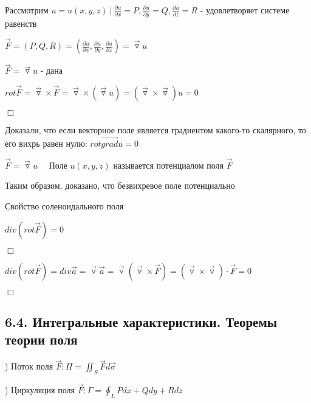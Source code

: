 \documentclass[12pt]{article}
\begin{document}
    Рассмотрим $u = u(x, y, z) \ | \ \frac{\partial u}{\partial x} = P, \frac{\partial u}{\partial y} = Q, \frac{\partial u}{\partial z} = R$ - удовлетворяет системе равенств

    $\overrightarrow{F} = (P, Q, R) = \left(\frac{\partial u}{\partial x}, \frac{\partial u}{\partial y}, \frac{\partial u}{\partial z}\right) = \overrightarrow{\triangledown} u$

    \fbox{\Longleftarrow} $\overrightarrow{F} = \overrightarrow{\triangledown}u$ - дана

    $rot \overrightarrow{F} = \overrightarrow{\triangledown} \times \overrightarrow{F} = \overrightarrow{\triangledown} \times (\overrightarrow{\triangledown} u) = (\overrightarrow{\triangledown} \times \overrightarrow{\triangledown}) u = 0$

    $\Box$

    \Nota Доказали, что если векторное поле является градиентом какого-то скалярного, то его вихрь равен нулю: $rot \overrightarrow{grad} u = 0$

    \Def $\overrightarrow{F} = \overrightarrow{\triangledown} u \quad$ Поле $u(x, y, z)$ называется потенциалом поля $\overrightarrow{F}$

    Таким образом, доказано, что безвихревое поле потенциально

    \hypertarget{solenoidalfieldproperty}{}

     Свойство соленоидального поля

    $div (rot \overrightarrow{F}) = 0$

    $\Box$

    $div (rot \overrightarrow{F}) = div \overrightarrow{a} = \overrightarrow{\triangledown} \overrightarrow{a} = \overrightarrow{\triangledown} (\overrightarrow{\triangledown} \times \overrightarrow{F}) = (\overrightarrow{\triangledown} \times \overrightarrow{\triangledown}) \cdot \overrightarrow{F} = 0$

    $\Box$

    \hypertarget{integralcharacteristics}{}

    \subsection{6.4. Интегральные характеристики. Теоремы теории поля}

    ) Поток поля $\overrightarrow{F}: \Pi = \iint_S \overrightarrow{F}d\overrightarrow{\sigma}$

    ) Циркуляция поля $\overrightarrow{F}: \Gamma = \oint_L Pdx + Qdy + Rdz$
\end{document}
